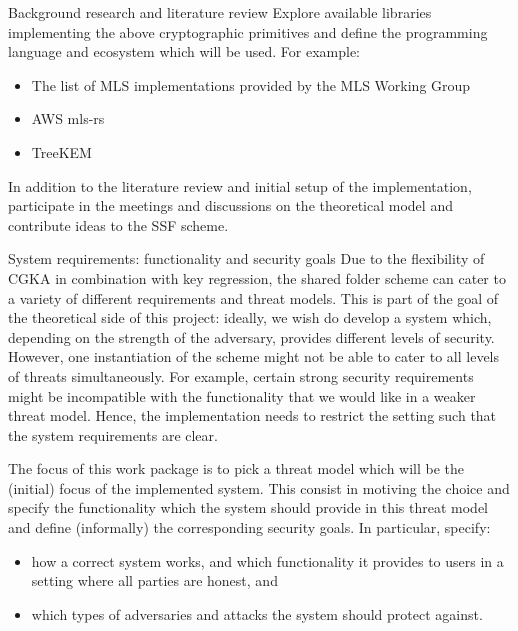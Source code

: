 \documentclass[E]{BAMASA}
\begin{document}
\begin{workpackage}{Background research and literature review}
Explore available libraries implementing the above cryptographic primitives and define the programming language and ecosystem which will be used. 
For example:
\begin{itemize}
    \item The list of MLS implementations provided by the MLS Working Group~\cite{MLSWGimpl}
    \item AWS mls-rs~\cite{AWSMLSrs}
    \item TreeKEM~\cite{TreeKEMimpl}
\end{itemize}

In addition to the literature review and initial setup of the implementation, participate in the meetings and discussions on the theoretical model and contribute ideas to the SSF scheme.

\end{workpackage}

\begin{workpackage}{System requirements: functionality and security goals}\label{wp:system-reqs}
    Due to the flexibility of CGKA in combination with key regression, the shared folder scheme 
    can cater to a variety of different requirements and threat models.
    This is part of the goal of the theoretical side of this project: 
    ideally, we wish do develop a system which, depending on the strength of the adversary, 
    provides different levels of security.
    However, one instantiation of the scheme might not be able to cater to all levels of threats 
    simultaneously.
    For example, certain strong security requirements might be incompatible with the functionality 
    that we would like in a weaker threat model.
    Hence, the implementation needs to restrict the setting such that the system requirements are clear.
    
    The focus of this work package is to pick a threat model which will be the (initial) focus 
    of the implemented system.
    This consist in motiving the choice and specify the functionality which the system should provide 
    in this threat model and define (informally) the corresponding security goals.
    In particular, specify:
    \begin{itemize}
        \item how a correct system works, and which functionality it provides to users in a setting 
                where all parties are honest, and
        \item which types of adversaries and attacks the system should protect against.
    \end{itemize}
\end{workpackage}
\end{document}
